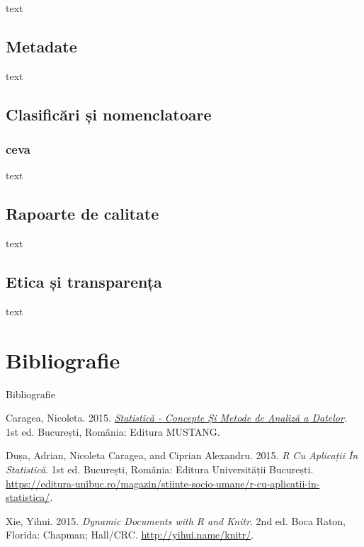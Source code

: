 \documentclass[
  11pt,
  b5paper,
  nottoc]{book}
\newlength{\cslhangindent}
\newenvironment{CSLReferences}[2] %
 {\begin{list}{}{%
  \setlength{\itemindent}{0pt}
  \setlength{\leftmargin}{0pt}
  \setlength{\parsep}{0pt}
  \ifodd #1
   \setlength{\leftmargin}{\cslhangindent}
   \setlength{\itemindent}{-1\cslhangindent}
  \fi
  \setlength{\itemsep}{#2\baselineskip}}}
 {\end{list}}
\begin{document}
text

\section{Metadate}\label{metadate}

text

\section{Clasificări și
nomenclatoare}\label{clasificux103ri-ux219i-nomenclatoare}

\subsection{ceva}\label{ceva}

text

\section{Rapoarte de calitate}\label{rapoarte-de-calitate}

text

\section{Etica și transparența}\label{etica-ux219i-transparenux21ba}

text


\chapter*{Bibliografie}\label{bibliografie}


Bibliografie

\label{refs}
\begin{CSLReferences}{1}{0}
Caragea, Nicoleta. 2015. \emph{\href{}{Statistică - Concepte Și Metode
de Analiză a Datelor}}. 1st ed. București, România: Editura MUSTANG.

Dușa, Adrian, Nicoleta Caragea, and Ciprian Alexandru. 2015. \emph{{R}
Cu Aplicații În Statistică}. 1st ed. București, România: Editura
Universității București.
\url{https://editura-unibuc.ro/magazin/stiinte-socio-umane/r-cu-aplicatii-in-statistica/}.

Xie, Yihui. 2015. \emph{Dynamic Documents with {R} and Knitr}. 2nd ed.
Boca Raton, Florida: Chapman; Hall/CRC. \url{http://yihui.name/knitr/}.

\end{CSLReferences}


\backmatter
\end{document}
